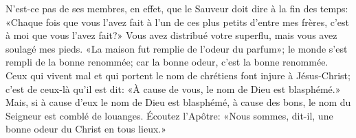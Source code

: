 N’est-ce pas de ses membres, en effet,
	que le Sauveur doit dire à la fin des temps:
	«Chaque fois que vous l’avez fait
		à l’un de ces plus petits d’entre mes frères,
	c’est à moi que vous l’avez fait?»
Vous avez distribué votre superflu, mais vous avez soulagé mes pieds.
«La maison fut remplie de l’odeur du parfum»;
	le monde s’est rempli de la bonne renommée;
	car la bonne odeur, c’est la bonne renommée.
Ceux qui vivent mal et qui portent le nom de chrétiens
		font injure à Jésus-Christ;
	c’est de ceux-là qu’il est dit:
		«À cause de vous, le nom de Dieu est blasphémé.»
Mais, si à cause d’eux le nom de Dieu est blasphémé,
	à cause des bons, le nom du Seigneur est comblé de louanges.
Écoutez l’Apôtre:
	«Nous sommes, dit-il, une bonne odeur du Christ en tous lieux.»
